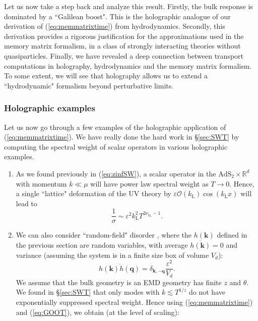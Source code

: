 \documentclass[10pt, oneside]{book}
\begin{document}
\begin{doublespace}
Let us now take a step back and analyze this result.   Firstly, the bulk response is dominated by a ``Galilean boost".  This is the holographic analogue of our derivation of (\ref{eq:memmatrixtime}) from hydrodynamics.   Secondly, this derivation provides a rigorous justification for the approximations used in the memory matrix formalism, in a class of strongly interacting theories without quasiparticles.   Finally, we have revealed a deep connection between transport computations in holography, hydrodynamics and the memory matrix formalism.   To some extent, we will see that holography allows us to extend a ``hydrodynamic" formalism beyond perturbative limits.

\subsubsection{Holographic examples}
Let us now go through a few examples of the holographic application of (\ref{eq:memmatrixtime}).  We have really done the hard work in \S \ref{sec:SWT} by computing the spectral weight of scalar operators in various holographic examples.
\begin{enumerate}  
\item As we found previously in (\ref{eq:zinfSW}), a scalar operator in the $\mathrm{AdS}_2\times\mathbb{R}^d$ with momentum $k \ll \mu$ will have power law spectral weight as $T\rightarrow 0$.   Hence, a single ``lattice" deformation of the UV theory by $\varepsilon \mathcal{O}(k_{\mathrm{L}}) \cos(k_{\mathrm{L}}x)$ will lead to \cite{Hartnoll:2012rj} \begin{equation}
\frac{1}{\sigma} \sim \varepsilon^2 k_{\mathrm{L}}^2 T^{2\nu_{k_{\mathrm{L}}}-1}.
\end{equation}
\item We can also consider ``random-field" disorder \cite{lucas1401, Hartnoll:2008hs}, where the $h(\mathbf{k})$ defined in the previous section are random variables, with average $\overline{h(\mathbf{k})} = 0$ and variance  (assuming the system is in a finite size box of volume $V_d$): \begin{equation}
\overline{h(\mathbf{k}) h(\mathbf{q})} = \delta_{\mathbf{k},-\mathbf{q}} \frac{\varepsilon^2}{V_d}.
\end{equation}
We assume that the bulk geometry is an EMD geometry has finite $z$ and $\theta$.   We found in \S \ref{sec:SWT} that only modes with $k\lesssim T^{1/z}$ do not have exponentially suppressed spectral weight.   Hence using (\ref{eq:memmatrixtime}) and (\ref{eq:GOOT}), we obtain (at the level of scaling):  \begin{equation}

\end{equation}
\end{enumerate}
\end{doublespace}
\end{document}
